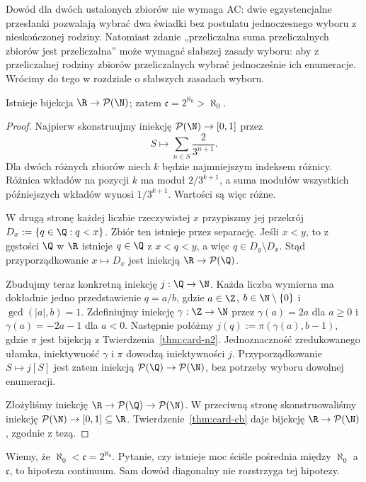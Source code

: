 \begin{uwaga}
Dowód dla dwóch ustalonych zbiorów nie wymaga AC: dwie egzystencjalne przesłanki pozwalają wybrać dwa świadki bez postulatu jednoczesnego wyboru z nieskończonej rodziny. Natomiast zdanie „przeliczalna suma przeliczalnych zbiorów jest przeliczalna” może wymagać słabszej zasady wyboru: aby z przeliczalnej rodziny zbiorów przeliczalnych wybrać jednocześnie ich enumeracje. Wrócimy do tego w rozdziale o słabszych zasadach wyboru.
\end{uwaga}
\begin{twierdzenie}\label{thm:card-continuum}
Istnieje bijekcja $\R\to\mathcal P(\N)$; zatem $\mathfrak c=2^{\aleph_0}>\aleph_0$.
\end{twierdzenie}
\begin{proof}
Najpierw skonstruujmy iniekcję $\mathcal P(\N)\to[0,1]$ przez
\[
S\longmapsto \sum_{n\in S}\frac{2}{3^{n+1}}.
\]
Dla dwóch różnych zbiorów niech $k$ będzie najmniejszym indeksem różnicy. Różnica wkładów na pozycji $k$ ma moduł $2/3^{k+1}$, a suma modułów wszystkich późniejszych wkładów wynosi $1/3^{k+1}$. Wartości są więc różne.

W drugą stronę każdej liczbie rzeczywistej $x$
przypiszmy jej przekrój
$D_x:=\{q\in\Q:q<x\}$.
Zbiór ten istnieje przez separację.
Jeśli $x<y$, to z gęstości $\Q$ w $\R$
istnieje $q\in\Q$ z $x<q<y$,
a więc $q\in D_y\setminus D_x$.
Stąd przyporządkowanie $x\mapsto D_x$
jest iniekcją $\R\to\mathcal P(\Q)$.

Zbudujmy teraz konkretną iniekcję $j:\Q\to\N$.
Każda liczba wymierna ma dokładnie jedno
przedstawienie $q=a/b$, gdzie $a\in\Z$,
$b\in\N\setminus\{0\}$ i $\gcd(|a|,b)=1$.
Zdefiniujmy iniekcję $\gamma:\Z\to\N$
przez $\gamma(a)=2a$ dla $a\ge0$
i $\gamma(a)=-2a-1$ dla $a<0$.
Następnie połóżmy
$j(q):=\pi(\gamma(a),b-1)$,
gdzie $\pi$ jest bijekcją
z Twierdzenia~\ref{thm:card-n2}.
Jednoznaczność zredukowanego ułamka,
iniektywność $\gamma$ i $\pi$
dowodzą iniektywności $j$.
Przyporządkowanie $S\mapsto j[S]$
jest zatem iniekcją
$\mathcal P(\Q)\to\mathcal P(\N)$,
bez potrzeby wyboru dowolnej enumeracji.

Złożyliśmy iniekcję
$\R\to\mathcal P(\Q)\to\mathcal P(\N)$.
W przeciwną stronę skonstruowaliśmy
iniekcję $\mathcal P(\N)\to[0,1]\subseteq\R$.
Twierdzenie~\ref{thm:card-cb} daje bijekcję
$\R\to\mathcal P(\N)$, zgodnie z tezą.
\end{proof}
\begin{uwaga}
Wiemy, że $\aleph_0<\mathfrak c=2^{\aleph_0}$. Pytanie, czy istnieje moc ściśle pośrednia między $\aleph_0$ a $\mathfrak c$, to hipoteza continuum. Sam dowód diagonalny nie rozstrzyga tej hipotezy.
\end{uwaga}

